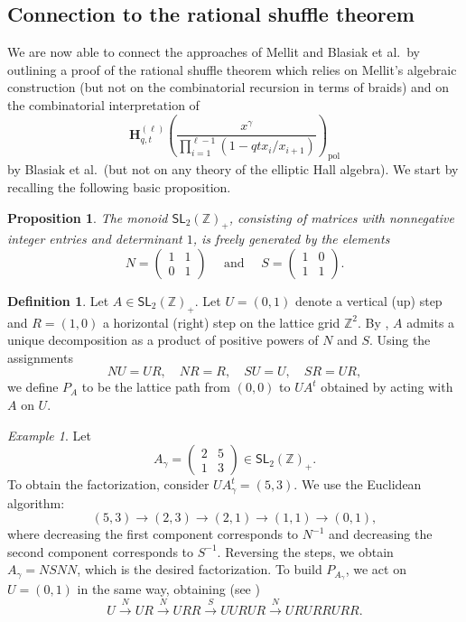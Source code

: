 \documentclass[reqno]{amsart}
\theoremstyle{plain}
\newtheorem{proposition}[theorem]{Proposition}
\theoremstyle{definition}
\newtheorem{definition}[theorem]{Definition}
\theoremstyle{remark}
\newtheorem{example}[theorem]{Example}
\newcommand{\<}{\langle}
\renewcommand{\>}{\rangle}
\begin{document}
\subsection{Connection to the rational shuffle theorem}
\label{section:D1}
We are now able to connect the approaches of Mellit and Blasiak et al.\ by outlining a proof of the rational shuffle theorem which relies on Mellit's algebraic construction \cite{Mellit2021Rational} (but not on the combinatorial recursion in terms of braids) and on the combinatorial interpretation of
\[ \mathbf{H}_{q,t}^{(\ell)}\left(\frac{x^\gamma}{\prod_{i=1}^{\ell-1}(1-qt x_i/x_{i+1})}\right)_{\mathrm{pol}} \]
by Blasiak et al.\ (but not on any theory of the elliptic Hall algebra).
We start by recalling the following basic proposition.

\begin{proposition}
    \label{prop:SL2}
    The monoid $\mathsf{SL}_2(\mathbb{Z})_+$, consisting of matrices with nonnegative integer entries and determinant $1$, is freely generated by the elements \[ N = \begin{pmatrix} 1 & 1 \\ 0 & 1 \end{pmatrix} \quad \text{ and } \quad S = \begin{pmatrix} 1 & 0 \\ 1 & 1 \end{pmatrix}. \]
\end{proposition}

\begin{definition}
    \label{def:lowest_path}
    Let $A \in \mathsf{SL}_2(\mathbb{Z})_+$. Let $U = (0,1)$ denote a vertical (up) step and $R = (1,0)$ a horizontal (right) step on the lattice grid $\mathbb{Z}^2$. By , $A$ admits a unique decomposition as a product of positive powers of $N$ and $S$. Using the assignments
    \[ N U = U R, \quad N R = R, \quad S U = U, \quad S R = U R, \]
    we define $P_A$ to be the lattice path from $(0,0)$ to $U A^t$ obtained by acting with $A$ on $U$.
\end{definition}

\begin{example}
    Let 
    \[ A_\gamma = \begin{pmatrix} 2 & 5 \\ 1 & 3 \end{pmatrix}  \in \mathsf{SL}_2(\mathbb{Z})_+. \]
    To obtain the factorization, consider $U A_\gamma^t = (5,3)$. We use the Euclidean algorithm:
    \[ (5,3) \rightarrow (2,3) \rightarrow (2,1) \rightarrow (1,1) \rightarrow (0,1), \]
    where decreasing the first component corresponds to $N^{-1}$ and decreasing the second component corresponds to $S^{-1}$. Reversing the steps, we obtain $A_\gamma = NSNN$, which is the desired factorization. To build $P_{A_\gamma}$, we act on $U = (0,1)$ in the same way, obtaining (see )
    \[ U \stackrel{N}{\rightarrow} UR \stackrel{N}{\rightarrow} URR \stackrel{S}{\rightarrow} UURUR \stackrel{N}{\rightarrow} URURRURR. \]
\end{example}
\end{document}
